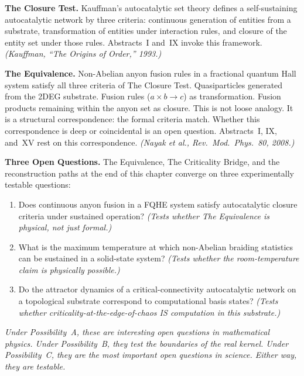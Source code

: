 \noindent\textbf{The Closure Test.} Kauffman's autocatalytic set theory defines a self-sustaining autocatalytic network by three criteria: continuous generation of entities from a substrate, transformation of entities under interaction rules, and closure of the entity set under those rules. Abstracts~I and~IX invoke this framework. \textit{(Kauffman, ``The Origins of Order,'' 1993.)}

\noindent\textbf{The Equivalence.} Non-Abelian anyon fusion rules in a fractional quantum Hall system satisfy all three criteria of The Closure Test. Quasiparticles generated from the 2DEG substrate. Fusion rules ($a \times b \rightarrow c$) as transformation. Fusion products remaining within the anyon set as closure. This is not loose analogy. It is a structural correspondence: the formal criteria match. Whether this correspondence is deep or coincidental is an open question. Abstracts~I, IX, and~XV rest on this correspondence. \textit{(Nayak et al., Rev.\ Mod.\ Phys.\ 80, 2008.)}

\medskip

\noindent\textbf{Three Open Questions.} The Equivalence, The Criticality Bridge, and the reconstruction paths at the end of this chapter converge on three experimentally testable questions:

\begin{enumerate}
\item Does continuous anyon fusion in a FQHE system satisfy autocatalytic closure criteria under sustained operation? \textit{(Tests whether The Equivalence is physical, not just formal.)}
\item What is the maximum temperature at which non-Abelian braiding statistics can be sustained in a solid-state system? \textit{(Tests whether the room-temperature claim is physically possible.)}
\item Do the attractor dynamics of a critical-connectivity autocatalytic network on a topological substrate correspond to computational basis states? \textit{(Tests whether criticality-at-the-edge-of-chaos IS computation in this substrate.)}
\end{enumerate}

\noindent\textit{Under Possibility~A, these are interesting open questions in mathematical physics. Under Possibility~B, they test the boundaries of the real kernel. Under Possibility~C, they are the most important open questions in science. Either way, they are testable.}

\medskip


